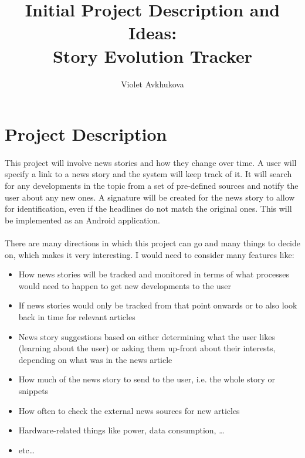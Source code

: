 \documentclass[11pt,a4paper]{article}
\begin{document}
\title{Initial Project Description and Ideas:\\Story Evolution Tracker}
\author{Violet Avkhukova}
\maketitle

\section{Project Description}
\paragraph{}
This project will involve news stories and how they change over time. A user will specify a link to a news story and the system will keep track of it. It will search for any developments in the topic from a set of pre-defined sources and notify the user about any new ones. A signature will be created for the news story to allow for identification, even if the headlines do not match the original ones. This will be implemented as an Android application.
\paragraph{}
There are many directions in which this project can go and many things to decide on, which makes it very interesting. I would need to consider many features like:
\begin{itemize}
\item How news stories will be tracked and monitored in terms of what processes would need to happen to get new developments to the user
\item If news stories would only be tracked from that point onwards or to also look back in time for relevant articles
\item News story suggestions based on either determining what the user likes (learning about the user) or asking them up-front about their interests, depending on what was in the news article
\item How much of the news story to send to the user, i.e. the whole story or snippets
\item How often to check the external news sources for new articles
\item Hardware-related things like power, data consumption, \ldots
\item etc\ldots
\end{itemize}
\end{document}
